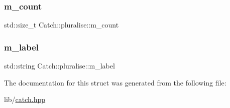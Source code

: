 \subsubsection{\texorpdfstring{m\+\_\+count}{m\_count}}
{\footnotesize\ttfamily std\+::size\+\_\+t Catch\+::pluralise\+::m\+\_\+count}

\hypertarget{struct_catch_1_1pluralise_a8849cbdd3f11ebe7747597c8644e8793}{}\label{struct_catch_1_1pluralise_a8849cbdd3f11ebe7747597c8644e8793} 
\subsubsection{\texorpdfstring{m\+\_\+label}{m\_label}}
{\footnotesize\ttfamily std\+::string Catch\+::pluralise\+::m\+\_\+label}



The documentation for this struct was generated from the following file\+:\begin{DoxyCompactItemize}
\item 
lib/\hyperlink{catch_8hpp}{catch.\+hpp}\end{DoxyCompactItemize}
